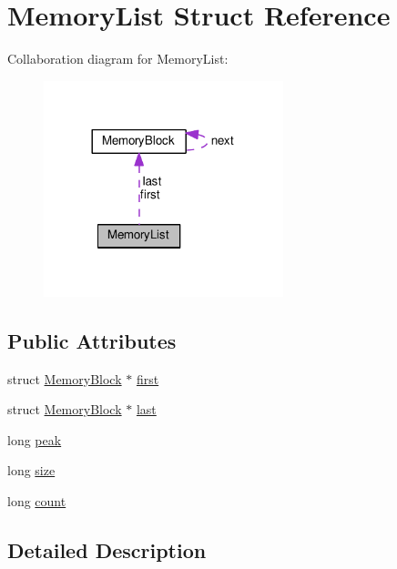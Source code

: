 \hypertarget{structMemoryList}{}\section{Memory\+List Struct Reference}
\label{structMemoryList}


Collaboration diagram for Memory\+List\+:\nopagebreak
\begin{figure}[H]
\begin{center}
\leavevmode
\includegraphics[width=197pt]{structMemoryList__coll__graph}
\end{center}
\end{figure}
\subsection*{Public Attributes}
\begin{DoxyCompactItemize}
\item 
struct \hyperlink{structMemoryBlock}{Memory\+Block} $\ast$ \hyperlink{structMemoryList_a0d47ad7371bb5f38e09ca5f35d85cecb}{first}
\item 
struct \hyperlink{structMemoryBlock}{Memory\+Block} $\ast$ \hyperlink{structMemoryList_afea5b720cf2a7c326cb53a604b90c354}{last}
\item 
long \hyperlink{structMemoryList_af2065db30ea83a216adb77fbdb59e1e4}{peak}
\item 
long \hyperlink{structMemoryList_ac481474722f97086e8316d62502c4881}{size}
\item 
long \hyperlink{structMemoryList_a6b5a62d10829b019db9b45eaf1928151}{count}
\end{DoxyCompactItemize}


\subsection{Detailed Description}


